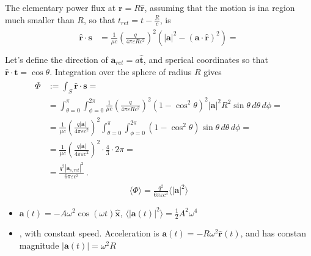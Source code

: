 \documentclass[letterpaper,10pt,english]{jupyterBook}
\begin{document}
\sphinxAtStartPar
The elementary power flux at \(\mathbf{r} = R \hat{\mathbf{r}}\), assuming that the motion is ina region much smaller than \(R\), so that \(t_{ret} = t - \frac{R}{c}\), is
\begin{equation*}
\begin{split}\begin{aligned}
  \hat{\mathbf{r}} \cdot \mathbf{s} 
  & = \frac{1}{\mu c} \left( \frac{q}{4 \pi \varepsilon R c^2} \right)^2 \left( |\mathbf{a}|^2 - ( \mathbf{a} \cdot \hat{\mathbf{r}} )^2 \right) = \\
\end{aligned}\end{split}
\end{equation*}
\sphinxAtStartPar
Let’s define the direction of \(\mathbf{a}_{ret} = a \hat{\mathbf{t}}\), and sperical coordinates so that \(\hat{\mathbf{r}} \cdot \mathbf{\mathbf{t}} = \cos \theta\). Integration over the sphere of radius \(R\) gives
\begin{equation*}
\begin{split}\begin{aligned}
  \Phi
  & := \int_{S} \hat{\mathbf{r}} \cdot \mathbf{s} = \\
  & = \int_{\theta=0}^{\pi} \int_{\phi = 0}^{2 \pi}  \frac{1}{\mu c} \left( \frac{q}{4 \pi \varepsilon R c^2} \right)^2 \left( 1 - \cos^2 \theta \right)^2 |\mathbf{a}|^2 R^2 \sin \theta \, d \theta \, d \phi = \\
  & = \frac{1}{\mu c} \left( \frac{q |\mathbf{a}|}{4 \pi \varepsilon c^2} \right)^2 \int_{\theta=0}^{\pi} \int_{\phi = 0}^{2 \pi} ( 1 - \cos^2 \theta) \sin \theta \, d \theta \, d \phi = \\
  & = \frac{1}{\mu c} \left( \frac{q |\mathbf{a}|}{4 \pi \varepsilon c^2} \right)^2 \cdot \frac{4}{3} \cdot 2 \pi = \\
  & = \frac{q^2 |\mathbf{a}_{s,ret}|^2}{6 \pi \varepsilon c^3} \ .
\end{aligned}\end{split}
\end{equation*}
\sphinxAtStartPar
{}
\begin{equation*}
\begin{split}\langle \Phi \rangle = \frac{q^2}{6  \pi \varepsilon c^3} \langle |\mathbf{a}|^2 \rangle\end{split}
\end{equation*}
\sphinxAtStartPar
{}
\begin{itemize}
\item {} 
\sphinxAtStartPar
{} \(\mathbf{a}(t) = - A \omega^2 \cos(\omega t) \hat{\mathbf{x}}\), \(\langle |\mathbf{a}(t)|^2 \rangle = \frac{1}{2} A^2 \omega^4 \)

\item {} 
\sphinxAtStartPar
{}, with constant speed. Acceleration is \(\mathbf{a}(t) = - R \omega^2 \hat{\mathbf{r}}(t)\), and has constan magnitude \(|\mathbf{a}(t)| = \omega^2 R\)

\end{itemize}
\end{document}
